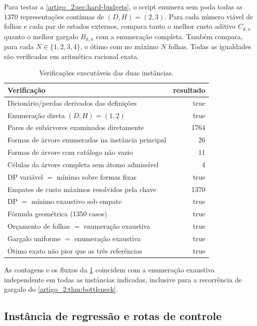 Para testar a \cref{artigo_2:sec:hard-budgets}, o script enumera sem poda todas as
$1370$ representações contínuas de $(D,H)=(2,3)$. Para cada número viável de
folhas e cada par de estados externos, compara tanto o melhor custo aditivo
$C_{d,n}$ quanto o melhor gargalo $B_{d,n}$ com a enumeração completa. Também
compara, para cada $N\in\{1,2,3,4\}$, o ótimo com no máximo $N$ folhas. Todas
as igualdades são verificadas em aritmética racional exata.

\begin{table}[t]
 \centering
 \caption{Verificações executáveis das duas instâncias.}
 \label{artigo_2:tab:dp-audit}
 \small
 \begin{tabularx}{\linewidth}{@{}Xr@{}}
\toprule
Verificação & resultado \\
\midrule
Dicionário/perdas derivados das definições & true \\
Enumeração direta $(D,H)=(1,2)$ & true \\
Pares de subárvores examinados diretamente & 1764 \\
Formas de árvore enumeradas na instância principal & 26 \\
Formas de árvore com catálogo não vazio & 11 \\
Células da árvore completa sem átomo admissível & 4 \\
DP variável $=$ mínimo sobre formas fixas & true \\
Empates de custo máximos resolvidos pela chave & 1370 \\
DP $=$ mínimo exaustivo sob empate & true \\
Fórmula geométrica (1350 casos) & true \\
Orçamento de folhas $=$ enumeração exaustiva & true \\
Gargalo uniforme $=$ enumeração exaustiva & true \\
Ótimo exato não pior que as três referências & true \\
\bottomrule
\end{tabularx}

\end{table}

As contagens e os fluxos da \cref{artigo_2:tab:dp-audit} coincidem com a enumeração
exaustiva independente em todas as instâncias indicadas, inclusive para a
recorrência de gargalo do \cref{artigo_2:thm:bottleneck}.

\subsection{Instância de regressão e rotas de controle}

